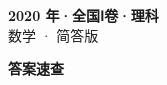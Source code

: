 \documentclass[zihao=-4, a4paper]{ctexart}
\begin{document}
\begin{center}
  {\Large\bfseries 2020 年·全国Ⅰ卷·理科}\\[4pt]
  {\large 数学 · 简答版}
\end{center}
\medskip
{}

\clearpage
{}
\begin{center}{\Large\bfseries 答案速查}\end{center}
\medskip

\end{document}
